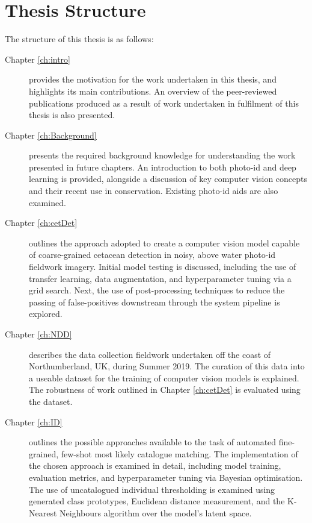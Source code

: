 \section{Thesis Structure}\label{ch:intro,sec:Structure}

The structure of this thesis is as follows:

\begin{description}
	\item[Chapter \ref{ch:intro}] provides the motivation for the work undertaken in this thesis, and highlights its main contributions. An overview of the peer-reviewed publications produced as a result of work undertaken in fulfilment of this thesis is also presented.
	
	\item[Chapter \ref{ch:Background}] presents the required background knowledge for understanding the work presented in future chapters. An introduction to both photo-id and deep learning is provided, alongside a discussion of key computer vision concepts and their recent use in conservation. Existing photo-id aids are also examined.
	
	\newpage
	
	\item[Chapter \ref{ch:cetDet}] outlines the approach adopted to create a computer vision model capable of coarse-grained cetacean detection in noisy, above water photo-id fieldwork imagery. Initial model testing is discussed, including the use of transfer learning, data augmentation, and hyperparameter tuning via a grid search. Next, the use of post-processing techniques to reduce the passing of false-positives downstream through the system pipeline is explored. 
	
	\item[Chapter \ref{ch:NDD}] describes the data collection fieldwork undertaken off the coast of Northumberland, UK, during Summer 2019. The curation of this data into a useable dataset for the training of computer vision models is explained. The robustness of work outlined in Chapter \ref{ch:cetDet} is evaluated using the dataset. 
	
	\item[Chapter \ref{ch:ID}] outlines the possible approaches available to the task of automated fine-grained, few-shot most likely catalogue matching. The implementation of the chosen approach is examined in detail, including model training, evaluation metrics, and hyperparameter tuning via Bayesian optimisation. The use of uncatalogued individual thresholding is examined using generated class prototypes, Euclidean distance measurement, and the K-Nearest Neighbours algorithm over the model's latent space. 
	

\end{description}

